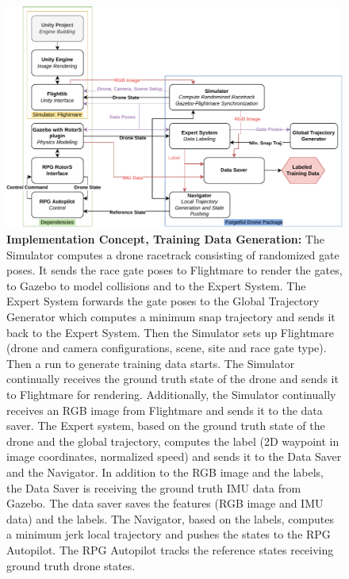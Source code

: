 \begin{figure}[H]
    \centering
    \includegraphics[width=1.0\textwidth]{figures/implementation_concept_training_data_generation.drawio.pdf}
    \caption[Implementation Concept, Training Data Generation]{\textbf{Implementation Concept, Training Data Generation:}
	The Simulator computes a drone racetrack consisting of randomized gate poses. It sends the race gate poses to Flightmare to render the gates,
	to Gazebo to model collisions and to the Expert System. The Expert System forwards the gate poses to the Global Trajectory Generator
	which computes a minimum snap trajectory and sends it back to the Expert System. Then the Simulator sets up Flightmare 
	(drone and camera configurations, scene, site and race gate type). Then a run to generate training data starts.
	The Simulator continually receives the ground truth state of the drone and sends it to Flightmare for rendering.
	Additionally, the Simulator continually receives an RGB image from Flightmare and sends it to the data saver.
	The Expert system, based on the ground truth state of the drone and the global trajectory, computes the label 
	(2D waypoint in image coordinates, normalized speed) and sends it to the Data Saver and the Navigator.
	In addition to the RGB image and the labels, the Data Saver is receiving the ground truth IMU data from Gazebo.
	The data saver saves the features (RGB image and IMU data) and the labels. 
	The Navigator, based on the labels, computes a minimum jerk local trajectory and pushes the states to the RPG Autopilot.
	The RPG Autopilot tracks the reference states receiving ground truth drone states.}
    \label{fig:OverviewDiagram}
\end{figure}


